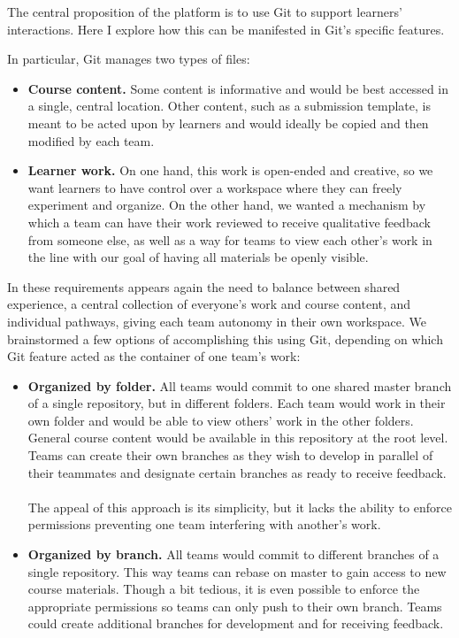 \documentclass[12pt,twoside]{mitthesis}
\newcommand{\review}[1]{{\color{mygreen} #1}}
\begin{document}
\review{The central proposition of the platform is to use Git to support learners' interactions. Here I explore how this can be manifested in Git's specific features.

In particular, Git manages two types of files:
\begin{itemize}
 	\item \textbf{Course content.} Some content is informative and would be best accessed in a single, central location. Other content, such as a submission template, is meant to be acted upon by learners and would ideally be copied and then modified by each team.
 	\item \textbf{Learner work.} On one hand, this work is open-ended and creative, so we want learners to have control over a workspace where they can freely experiment and organize. On the other hand, we wanted a mechanism by which a team can have their work reviewed to receive qualitative feedback from someone else, as well as a way for teams to view each other's work in the line with our goal of having all materials be openly visible.
\end{itemize} 
In these requirements appears again the need to balance between shared experience, a central collection of everyone's work and course content, and individual pathways, giving each team autonomy in their own workspace. We brainstormed a few options of accomplishing this using Git, depending on which Git feature acted as the container of one team's work:
\begin{itemize}
\item \textbf{Organized by folder.} All teams would commit to one shared master branch of a single repository, but in different folders. Each team would work in their own folder and would be able to view others' work in the other folders. General course content would be available in this repository at the root level. Teams can create their own branches as they wish to develop in parallel of their teammates and designate certain branches as ready to receive feedback.\\ \\
The appeal of this approach is its simplicity, but it lacks the ability to enforce permissions preventing one team interfering with another's work.
\item \textbf{Organized by branch.} All teams would commit to different branches of a single repository. This way teams can rebase on master to gain access to new course materials. Though a bit tedious, it is even possible to enforce the appropriate permissions so teams can only push to their own branch. Teams could create additional branches for development and for receiving feedback.\\ \\

\end{itemize}}
\end{document}
